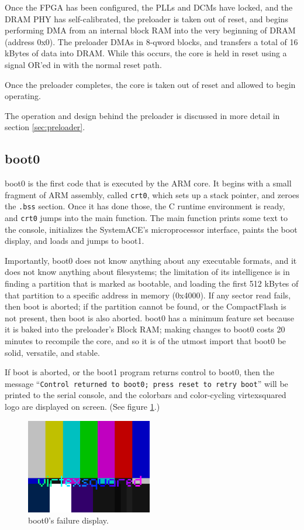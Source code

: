 \documentclass[10pt]{article}
\begin{document}
Once the FPGA has been configured, the PLLs and DCMs have locked, and the
DRAM PHY has self-calibrated, the preloader is taken out of reset, and
begins performing DMA from an internal block RAM into the very beginning of
DRAM (address 0x0). The preloader DMAs in 8-qword blocks, and transfers a
total of 16 kBytes of data into DRAM. While this occurs, the core is held in
reset using a signal OR'ed in with the normal reset path.

Once the preloader completes, the core is taken out of reset and allowed to
begin operating.

The operation and design behind the preloader is discussed in more detail in
section \ref{sec:preloader}.

\subsection{boot0}

boot0 is the first code that is executed by the ARM core. It begins with a
small fragment of ARM assembly, called \texttt{crt0}, which sets up a stack
pointer, and zeroes the \texttt{.bss} section.  Once it has done those, the
C runtime environment is ready, and \texttt{crt0} jumps into the main
function.  The main function prints some text to the console, initializes
the SystemACE's microprocessor interface, paints the boot display, and loads
and jumps to boot1.

Importantly, boot0 does not know anything about any executable formats, and
it does not know anything about filesystems; the limitation of its
intelligence is in finding a partition that is marked as bootable, and
loading the first 512 kBytes of that partition to a specific address in
memory (0x4000). If any sector read fails, then boot is aborted; if the
partition cannot be found, or the CompactFlash is not present, then boot is
also aborted. boot0 has a minimum feature set because it is baked into the
preloader's Block RAM; making changes to boot0 costs 20 minutes to recompile
the core, and so it is of the utmost import that boot0 be solid, versatile,
and stable.

If boot is aborted, or the boot1 program returns control to boot0, then the
message ``\texttt{Control returned to boot0; press reset to retry boot}'' will
be printed to the serial console, and the colorbars and color-cycling
virtexsquared logo are displayed on screen.  (See figure \ref{img:boot0}.)

\begin{figure}
  \centering
    \includegraphics[width=0.49\textwidth]{boot0.png}
  \caption{boot0's failure display.} \label{img:boot0}
\end{figure}
\end{document}
